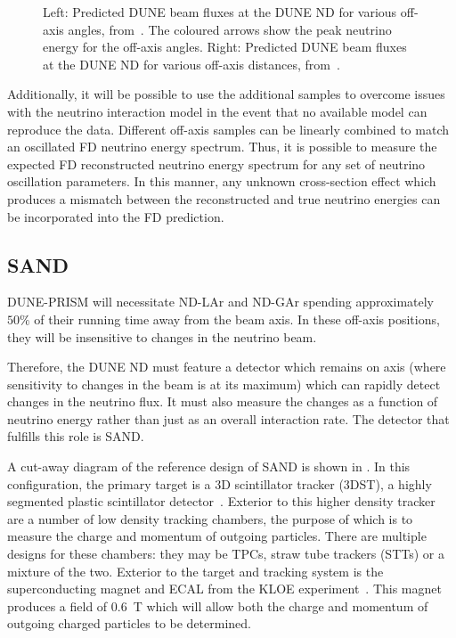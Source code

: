 \begin{figure}[h]
\begin{minipage}[t]{0.49\textwidth}
  \end{minipage}
  \caption[Beam \numu fluxes at different off-axis distances and angles at the DUNE ND]{Left: Predicted DUNE beam \numu fluxes at the DUNE ND for various off-axis angles, from~\cite{ndCdr}. The coloured arrows show the peak neutrino energy for the off-axis angles. Right: Predicted DUNE beam \numu fluxes at the DUNE ND for various off-axis distances, from~\cite{ndCdr}.}
  \label{fig:offAxisFluxes}
\end{figure}

Additionally, it will be possible to use the additional samples to overcome issues with the neutrino interaction model in the event that no available model can reproduce the data.
Different off-axis samples can be linearly combined to match an oscillated FD neutrino energy spectrum.
Thus, it is possible to measure the expected FD reconstructed neutrino energy spectrum for any set of neutrino oscillation parameters.
In this manner, any unknown cross-section effect which produces a mismatch between the reconstructed and true neutrino energies can be incorporated into the FD prediction.

\subsection{SAND}
\label{sec:dune:nd:sand}

DUNE-PRISM will necessitate ND-LAr and ND-GAr spending approximately $50\%$ of their running time away from the beam axis.
In these off-axis positions, they will be insensitive to changes in the neutrino beam.

Therefore, the DUNE ND must feature a detector which remains on axis (where sensitivity to changes in the beam is at its maximum) which can rapidly detect changes in the neutrino flux.
It must also measure the changes as a function of neutrino energy rather than just as an overall interaction rate.
The detector that fulfills this role is SAND.

A cut-away diagram of the reference design of SAND is shown in .
In this configuration, the primary target is a 3D scintillator tracker (3DST), a highly segmented plastic scintillator detector~\cite{3dst}.
Exterior to this higher density tracker are a number of low density tracking chambers, the purpose of which is to measure the charge and momentum of outgoing particles.
There are multiple designs for these chambers: they may be TPCs, straw tube trackers (STTs) or a mixture of the two.
Exterior to the target and tracking system is the superconducting magnet and ECAL from the KLOE experiment~\cite{kloeEcal}.
This magnet produces a field of \SI{0.6}{\tesla} which will allow both the charge and momentum of outgoing charged particles to be determined.

